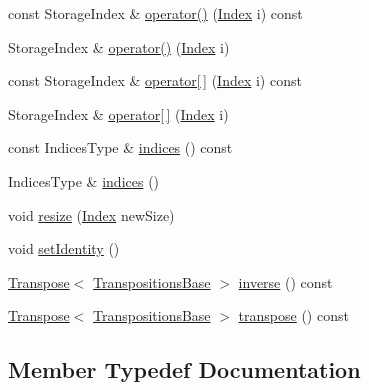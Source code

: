 \begin{DoxyCompactItemize}
\item 
const Storage\+Index \& \mbox{\hyperlink{class_eigen_1_1_transpositions_base_a150860addd2418f37da291f0ad9395f2}{operator()}} (\mbox{\hyperlink{class_eigen_1_1_transpositions_base_a3f5f06118b419e8e6ccbe49ed5b4c91f}{Index}} i) const
\item 
Storage\+Index \& \mbox{\hyperlink{class_eigen_1_1_transpositions_base_a8b3eb221d9ec1e51a161d276a0020e24}{operator()}} (\mbox{\hyperlink{class_eigen_1_1_transpositions_base_a3f5f06118b419e8e6ccbe49ed5b4c91f}{Index}} i)
\item 
const Storage\+Index \& \mbox{\hyperlink{class_eigen_1_1_transpositions_base_a689c79a6cdac938218de46638decb895}{operator\mbox{[}$\,$\mbox{]}}} (\mbox{\hyperlink{class_eigen_1_1_transpositions_base_a3f5f06118b419e8e6ccbe49ed5b4c91f}{Index}} i) const
\item 
Storage\+Index \& \mbox{\hyperlink{class_eigen_1_1_transpositions_base_a8951554cfdf4840b4bab9864caecc60a}{operator\mbox{[}$\,$\mbox{]}}} (\mbox{\hyperlink{class_eigen_1_1_transpositions_base_a3f5f06118b419e8e6ccbe49ed5b4c91f}{Index}} i)
\item 
const Indices\+Type \& \mbox{\hyperlink{class_eigen_1_1_transpositions_base_a90acc796341b4627882705d1099e593d}{indices}} () const
\item 
Indices\+Type \& \mbox{\hyperlink{class_eigen_1_1_transpositions_base_a20eda0545eb00e887959f38b3a428a96}{indices}} ()
\item 
void \mbox{\hyperlink{class_eigen_1_1_transpositions_base_a3dfa713d74fc1f9a7e589b3d428f7849}{resize}} (\mbox{\hyperlink{class_eigen_1_1_transpositions_base_a3f5f06118b419e8e6ccbe49ed5b4c91f}{Index}} new\+Size)
\item 
void \mbox{\hyperlink{class_eigen_1_1_transpositions_base_a8da379438691ea694948ea5ae31d305f}{set\+Identity}} ()
\item 
\mbox{\hyperlink{class_eigen_1_1_transpose}{Transpose}}$<$ \mbox{\hyperlink{class_eigen_1_1_transpositions_base}{Transpositions\+Base}} $>$ \mbox{\hyperlink{class_eigen_1_1_transpositions_base_affcac2f2ebcd5a8bf9067e20d3681d78}{inverse}} () const
\item 
\mbox{\hyperlink{class_eigen_1_1_transpose}{Transpose}}$<$ \mbox{\hyperlink{class_eigen_1_1_transpositions_base}{Transpositions\+Base}} $>$ \mbox{\hyperlink{class_eigen_1_1_transpositions_base_a2ddede41421797738fc58ee1074efb8f}{transpose}} () const
\end{DoxyCompactItemize}


\subsection{Member Typedef Documentation}
\mbox{\label{class_eigen_1_1_transpositions_base_a3f5f06118b419e8e6ccbe49ed5b4c91f}} 
